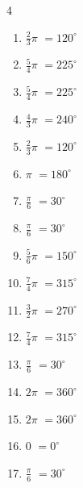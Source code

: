 \begin{multicols}{4}
\begin{enumerate}
  \item $\displaystyle \frac{2}{3}\pi$
        $\displaystyle =120^{\circ}$

  \item $\displaystyle \frac{5}{4}\pi$
        $\displaystyle =225^{\circ}$

  \item $\displaystyle \frac{5}{4}\pi$
        $\displaystyle =225^{\circ}$

  \item $\displaystyle \frac{4}{3}\pi$
        $\displaystyle =240^{\circ}$

  \item $\displaystyle \frac{2}{3}\pi$
        $\displaystyle =120^{\circ}$

  \item $\displaystyle \pi$
        $\displaystyle =180^{\circ}$

  \item $\displaystyle \frac{\pi}{6}$
        $\displaystyle =30^{\circ}$

  \item $\displaystyle \frac{\pi}{6}$
        $\displaystyle =30^{\circ}$

  \item $\displaystyle \frac{5}{6}\pi$
        $\displaystyle =150^{\circ}$

  \item $\displaystyle \frac{7}{4}\pi$
        $\displaystyle =315^{\circ}$

  \item $\displaystyle \frac{3}{2}\pi$
        $\displaystyle =270^{\circ}$

  \item $\displaystyle \frac{7}{4}\pi$
        $\displaystyle =315^{\circ}$

  \item $\displaystyle \frac{\pi}{6}$
        $\displaystyle =30^{\circ}$

  \item $\displaystyle 2\pi$
        $\displaystyle =360^{\circ}$

  \item $\displaystyle 2\pi$
        $\displaystyle =360^{\circ}$

  \item $\displaystyle 0$
        $\displaystyle =0^{\circ}$

  \item $\displaystyle \frac{\pi}{6}$
        $\displaystyle =30^{\circ}$


\end{enumerate}
\end{multicols}
